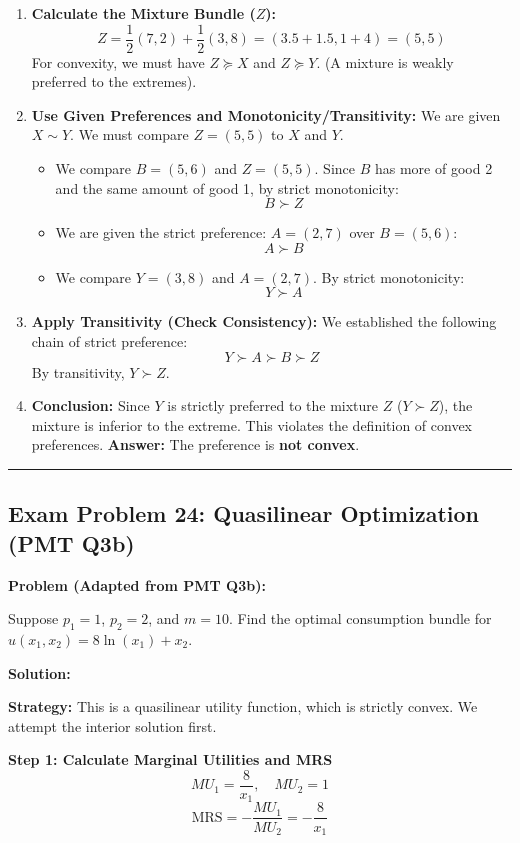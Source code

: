 \documentclass{article}
\begin{document}
\begin{enumerate}
\item \textbf{Calculate the Mixture Bundle ($Z$):} \[ Z = \frac{1}{2}(7, 2) + \frac{1}{2}(3, 8) = (3.5 + 1.5, 1 + 4) = (5, 5) \] For convexity, we must have $Z \succeq X$ and $Z \succeq Y$. (A mixture is weakly preferred to the extremes).
\item \textbf{Use Given Preferences and Monotonicity/Transitivity:} We are given $X \sim Y$. We must compare $Z=(5, 5)$ to $X$ and $Y$.
\begin{itemize}
\item We compare $B=(5, 6)$ and $Z=(5, 5)$. Since $B$ has more of good 2 and the same amount of good 1, by strict monotonicity: \[ B \succ Z \]
\item We are given the strict preference: $A=(2, 7)$ over $B=(5, 6)$: \[ A \succ B \]
\item We compare $Y=(3, 8)$ and $A=(2, 7)$. By strict monotonicity: \[ Y \succ A \]
\end{itemize}
\item \textbf{Apply Transitivity (Check Consistency):} We established the following chain of strict preference: \[ Y \succ A \succ B \succ Z \] By transitivity, $Y \succ Z$.
\item \textbf{Conclusion:} Since $Y$ is strictly preferred to the mixture $Z$ ($Y \succ Z$), the mixture is inferior to the extreme. This violates the definition of convex preferences. \textbf{Answer:} The preference is \textbf{not convex}.
\end{enumerate}

\vspace{1em}\hrule\vspace{1em}

\subsection*{Exam Problem 24: Quasilinear Optimization (PMT Q3b)}

\textbf{Problem (Adapted from PMT Q3b):}

Suppose $p_1=1$, $p_2=2$, and $m=10$. Find the optimal consumption bundle for $u(x_1, x_2) = 8 \ln(x_1) + x_2$.

\textbf{Solution:}

\textbf{Strategy:} This is a quasilinear utility function, which is strictly convex. We attempt the interior solution first.

\textbf{Step 1: Calculate Marginal Utilities and MRS}
\[ MU_1 = \frac{8}{x_1}, \quad MU_2 = 1 \]
\[ \text{MRS} = -\frac{MU_1}{MU_2} = -\frac{8}{x_1} \]
\end{document}
